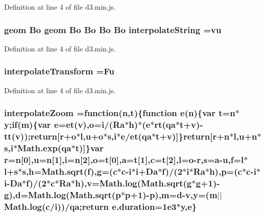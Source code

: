 Definition at line 4 of file d3.\+min.\+js.

\subsubsection[{interpolate\+String}]{ geom {\bf Bo} geom {\bf Bo} {\bf Bo} {\bf Bo} {\bf Bo} interpolate\+String ={\bf vu}}\label{d3_8min_8js_a4e9b3ff9f537286caff87635e928bf0e}


Definition at line 4 of file d3.\+min.\+js.

\subsubsection[{interpolate\+Transform}]{ interpolate\+Transform ={\bf Fu}}\label{d3_8min_8js_a22cc5563a854860f4067bdbf780f3fc4}


Definition at line 4 of file d3.\+min.\+js.

\subsubsection[{interpolate\+Zoom}]{ interpolate\+Zoom =function({\bf n},t)\{function {\bf e}({\bf n})\{var t={\bf n}$\ast$y;{\bf if}(m)\{var {\bf e}=et(v),{\bf o}={\bf i}/({\bf Ra}$\ast$h)$\ast$({\bf e}$\ast$rt({\bf qa}$\ast$t+v)-\/tt(v));{\bf return}[{\bf r}+{\bf o}$\ast$l,u+{\bf o}$\ast$s,{\bf i}$\ast${\bf e}/et({\bf qa}$\ast$t+v)]\}{\bf return}[{\bf r}+{\bf n}$\ast$l,u+{\bf n}$\ast$s,{\bf i}$\ast$Math.\+exp({\bf qa}$\ast$t)]\}var {\bf r}={\bf n}[0],u={\bf n}[1],{\bf i}={\bf n}[2],{\bf o}=t[0],{\bf a}=t[1],{\bf c}=t[2],l={\bf o}-\/{\bf r},s={\bf a}-\/u,{\bf f}=l$\ast$l+s$\ast$s,h={\bf Math.\+sqrt}({\bf f}),g=({\bf c}$\ast${\bf c}-\/{\bf i}$\ast${\bf i}+{\bf Da}$\ast${\bf f})/(2$\ast${\bf i}$\ast${\bf Ra}$\ast$h),p=({\bf c}$\ast${\bf c}-\/{\bf i}$\ast${\bf i}-\/{\bf Da}$\ast${\bf f})/(2$\ast${\bf c}$\ast${\bf Ra}$\ast$h),v={\bf Math.\+log}({\bf Math.\+sqrt}(g$\ast$g+1)-\/g),{\bf d}={\bf Math.\+log}({\bf Math.\+sqrt}(p$\ast$p+1)-\/p),m={\bf d}-\/v,y=(m$\vert$$\vert${\bf Math.\+log}({\bf c}/{\bf i}))/{\bf qa};{\bf return} {\bf e.\+duration}=1e3$\ast$y,e\}}\label{d3_8min_8js_a99217df47d14878042cb37a1cb215c48}


